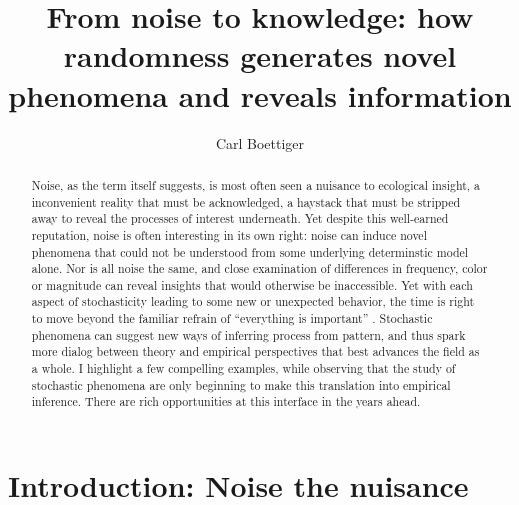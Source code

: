 \documentclass[preprint, 3p,
authoryear]{elsarticle} %
\begin{document}
\begin{frontmatter}

  \title{From noise to knowledge: how randomness generates novel
phenomena and reveals information}
    \author[University of California Berkeley]{Carl Boettiger%
  }
  
  \begin{abstract}
  Noise, as the term itself suggests, is most often seen a nuisance to
  ecological insight, a inconvenient reality that must be acknowledged,
  a haystack that must be stripped away to reveal the processes of
  interest underneath. Yet despite this well-earned reputation, noise is
  often interesting in its own right: noise can induce novel phenomena
  that could not be understood from some underlying determinstic model
  alone. Nor is all noise the same, and close examination of differences
  in frequency, color or magnitude can reveal insights that would
  otherwise be inaccessible. Yet with each aspect of stochasticity
  leading to some new or unexpected behavior, the time is right to move
  beyond the familiar refrain of ``everything is important''
  \citep{Bjornstad2001}. Stochastic phenomena can suggest new ways of
  inferring process from pattern, and thus spark more dialog between
  theory and empirical perspectives that best advances the field as a
  whole. I highlight a few compelling examples, while observing that the
  study of stochastic phenomena are only beginning to make this
  translation into empirical inference. There are rich opportunities at
  this interface in the years ahead.
  \end{abstract}
  
 \end{frontmatter}

\newpage

\hypertarget{introduction-noise-the-nuisance}{%
\section{Introduction: Noise the
nuisance}\label{introduction-noise-the-nuisance}}
\end{document}
